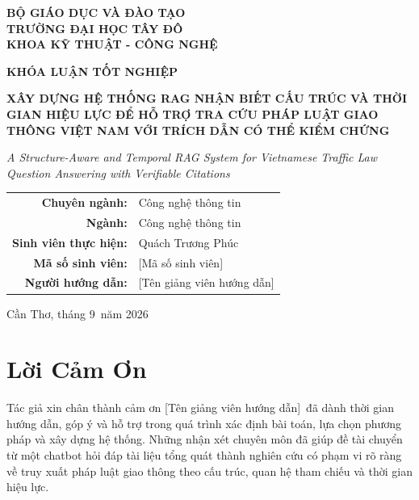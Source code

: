 \documentclass[a4paper,12pt]{extreport}
\newcommand{\StudentName}{Quách Trương Phúc}
\newcommand{\StudentId}{[Mã số sinh viên]}
\newcommand{\AdvisorName}{[Tên giảng viên hướng dẫn]}
\newcommand{\ThesisMonth}{9}
\newcommand{\ThesisYear}{2026}
\newcommand{\ThesisTitleVN}{XÂY DỰNG HỆ THỐNG RAG NHẬN BIẾT CẤU TRÚC VÀ THỜI GIAN HIỆU LỰC ĐỂ HỖ TRỢ TRA CỨU PHÁP LUẬT GIAO THÔNG VIỆT NAM VỚI TRÍCH DẪN CÓ THỂ KIỂM CHỨNG}
\newcommand{\ThesisTitleEN}{A Structure-Aware and Temporal RAG System for Vietnamese Traffic Law Question Answering with Verifiable Citations}
\begin{document}
\thispagestyle{empty}
\begin{center}
{\fontsize{16}{19}\selectfont\bfseries
BỘ GIÁO DỤC VÀ ĐÀO TẠO\\
TRƯỜNG ĐẠI HỌC TÂY ĐÔ\\
KHOA KỸ THUẬT - CÔNG NGHỆ
}

\vspace{2.2cm}

{\fontsize{16}{19}\selectfont\bfseries KHÓA LUẬN TỐT NGHIỆP}

\vspace{1.8cm}

{\fontsize{18}{22}\selectfont\bfseries \ThesisTitleVN}

\vspace{1cm}

{\fontsize{13}{16}\selectfont\itshape \ThesisTitleEN}

\vspace{1.8cm}

\begin{tabular}{>{\bfseries}rl}
Chuyên ngành: & Công nghệ thông tin\\
Ngành: & Công nghệ thông tin\\
Sinh viên thực hiện: & \StudentName\\
Mã số sinh viên: & \StudentId\\
Người hướng dẫn: & \AdvisorName\\
\end{tabular}

\vfill
{\fontsize{14}{17}\selectfont Cần Thơ, tháng \ThesisMonth\ năm \ThesisYear}
\end{center}
\clearpage

\setcounter{page}{1}

\chapter*{Lời Cảm Ơn}

Tác giả xin chân thành cảm ơn \AdvisorName\ đã dành thời gian hướng dẫn, góp ý và hỗ trợ trong quá trình xác định bài toán, lựa chọn phương pháp và xây dựng hệ thống. Những nhận xét chuyên môn đã giúp đề tài chuyển từ một chatbot hỏi đáp tài liệu tổng quát thành nghiên cứu có phạm vi rõ ràng về truy xuất pháp luật giao thông theo cấu trúc, quan hệ tham chiếu và thời gian hiệu lực.
\end{document}
